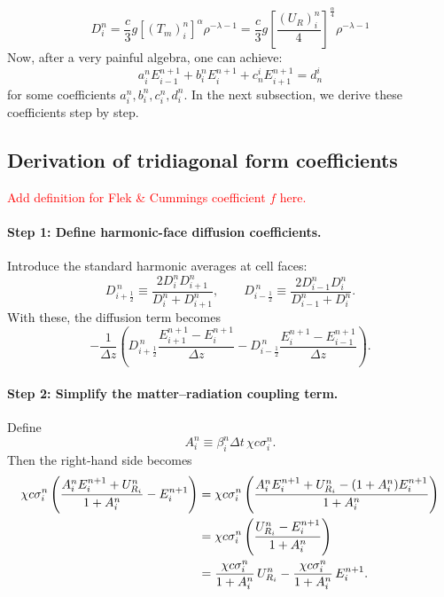 \documentclass{article}
\begin{document}
\begin{equation}
    D_i^n=\frac{c}{3}g[(T_m)^n_i]^\alpha \rho^{-\lambda - 1}=\frac{c}{3}g\left[\frac{(U_R)^n_i}{4}\right]^\frac{\alpha}{4} \rho^{-\lambda - 1}
\end{equation}
Now, after a very painful algebra, one can achieve:
\begin{equation}
    \boxed{a_i^n E_{i-1}^{n+1}+b_i^n E_i^{n+1} +c^i_n E_{i+1}^{n+1}=d_n^i}
\end{equation}
for some coefficients $a_i^n,b_i^n,c_i^n,d_i^n$. In the next subsection, we derive these coefficients step by step.

\subsection{Derivation of tridiagonal form coefficients}
\textcolor{red}{Add definition for Flek \& Cummings coefficient $f$ here.}
\paragraph{Step 1: Define harmonic-face diffusion coefficients.}
Introduce the standard harmonic averages at cell faces:
\begin{equation}
D_{i+\frac12}^{\,n}\equiv \frac{2D_i^{n}D_{i+1}^{n}}{D_i^{n}+D_{i+1}^{n}},
\qquad
D_{i-\frac12}^{\,n}\equiv \frac{2D_{i-1}^{n}D_i^{n}}{D_{i-1}^{n}+D_i^{n}}.
\end{equation}
With these, the diffusion term becomes
\begin{equation}
-\frac{1}{\Delta z}\left(
D_{i+\frac12}^{\,n}\frac{E_{i+1}^{n+1}-E_i^{n+1}}{\Delta z}
-
D_{i-\frac12}^{\,n}\frac{E_{i}^{n+1}-E_{i-1}^{n+1}}{\Delta z}
\right).
\end{equation}

\paragraph{Step 2: Simplify the matter--radiation coupling term.}
Define
\begin{equation}
A_i^n \equiv  \beta_i^{n}\Delta t \,\chi c \sigma_i^{n}.
\end{equation}
Then the right-hand side becomes
\begin{align}
\chi c \sigma_i^{n}\left(\frac{A_i^n E_i^{n+1}+U_{R_i}^n}{1+A_i^n}-E_i^{n+1}\right)
&=
\chi c \sigma_i^{n}\left(\frac{A_i^n E_i^{n+1}+U_{R_i}^n-(1+A_i^n)E_i^{n+1}}{1+A_i^n}\right)\notag\\
&=
\chi c \sigma_i^{n}\left(\frac{U_{R_i}^n-E_i^{n+1}}{1+A_i^n}\right)\notag\\
&=
\frac{\chi c \sigma_i^{n}}{1+A_i^n}\,U_{R_i}^n
-
\frac{\chi c \sigma_i^{n}}{1+A_i^n}\,E_i^{n+1}.
\end{align}
\end{document}
